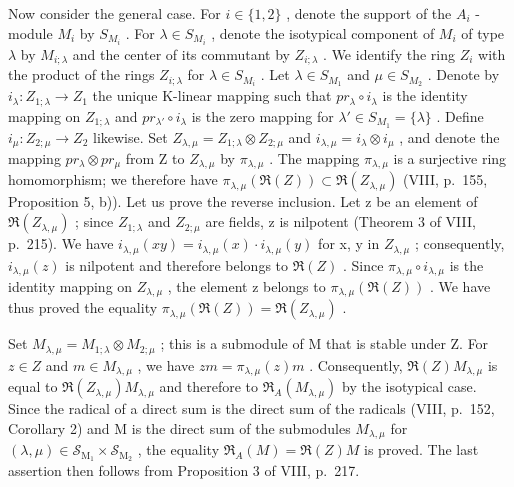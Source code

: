 Now consider the general case. For \(i \in \{1,2\}\) , denote the support of the \(A_{i}\) -module \(M_{i}\) by \(S_{M_{i}}\) . For \(\lambda \in S_{M_{i}}\) , denote the isotypical component of \(M_{i}\) of type \(\lambda\) by \(M_{i;\lambda}\) and the center of its commutant by \(Z_{i;\lambda}\) . We identify the ring \(Z_{i}\) with the product of the rings \(Z_{i;\lambda}\) for \(\lambda \in S_{M_{i}}\) . Let \(\lambda \in S_{M_{1}}\) and \(\mu \in S_{M_{2}}\) . Denote by \(i_{\lambda}: Z_{1;\lambda} \to Z_{1}\) the unique K-linear mapping such that \(pr_{\lambda} \circ i_{\lambda}\) is the identity mapping on \(Z_{1;\lambda}\) and \(pr_{\lambda'} \circ i_{\lambda}\) is the zero mapping for \(\lambda' \in S_{M_{1}} = \{\lambda\}\) . Define \(i_{\mu}: Z_{2;\mu} \to Z_{2}\) likewise. Set \(Z_{\lambda,\mu} = Z_{1;\lambda} \otimes Z_{2;\mu}\) and \(i_{\lambda,\mu} = i_{\lambda} \otimes i_{\mu}\) , and denote the mapping \(pr_{\lambda} \otimes pr_{\mu}\) from Z to \(Z_{\lambda,\mu}\) by \(\pi_{\lambda,\mu}\) . The mapping \(\pi_{\lambda,\mu}\) is a surjective ring homomorphism; we therefore have \(\pi_{\lambda,\mu}(\Re(Z)) \subset \Re(Z_{\lambda,\mu})\) (VIII, p.~155, Proposition 5, b)). Let us prove the reverse inclusion. Let z be an element of \(\Re(Z_{\lambda,\mu})\) ; since \(Z_{1;\lambda}\) and \(Z_{2;\mu}\) are fields, z is nilpotent (Theorem 3 of VIII, p.~215). We have \(i_{\lambda,\mu}(xy) = i_{\lambda,\mu}(x) \cdot i_{\lambda,\mu}(y)\) for x, y in \(Z_{\lambda,\mu}\) ; consequently, \(i_{\lambda,\mu}(z)\) is nilpotent and therefore belongs to \(\Re(Z)\) . Since \(\pi_{\lambda,\mu} \circ i_{\lambda,\mu}\) is the identity mapping on \(Z_{\lambda,\mu}\) , the element z belongs to \(\pi_{\lambda,\mu}(\Re(Z))\) . We have thus proved the equality \(\pi_{\lambda,\mu}(\Re(Z)) = \Re(Z_{\lambda,\mu})\) .

Set \(M_{\lambda,\mu}=M_{1;\lambda}\otimes M_{2;\mu}\) ; this is a submodule of M that is stable under Z. For \(z\in Z\) and \(m\in M_{\lambda,\mu}\) , we have \(zm=\pi_{\lambda,\mu}(z)m\) . Consequently, \(\Re(Z)M_{\lambda,\mu}\) is equal to \(\Re(Z_{\lambda,\mu})M_{\lambda,\mu}\) and therefore to \(\Re_{A}(M_{\lambda,\mu})\) by the isotypical case. Since the radical of a direct sum is the direct sum of the radicals (VIII, p.~152, Corollary 2) and M is the direct sum of the submodules \(M_{\lambda,\mu}\) for \((\lambda,\mu)\in\mathcal{S}_{\mathrm{M}_{1}}\times\mathcal{S}_{\mathrm{M}_{2}}\) , the equality \(\Re_{A}(M)=\Re(Z)M\) is proved. The last assertion then follows from Proposition 3 of VIII, p.~217.

